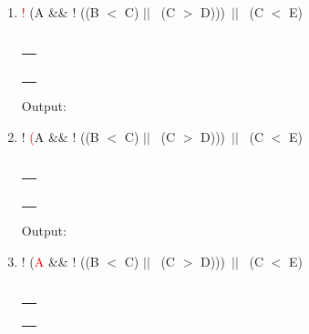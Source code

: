 \documentclass[a4paper]{article}
\begin{document}
\begin{large}
  \begin{enumerate}
    \renewcommand{\arraystretch}{1.3}
    \item
          \textcolor{red}{!} (A \&\& ! ((B $<$ C) $||$ \ (C $>$ D)))\ $||$ \ (C $<$ E) \\
          \\
          \begin{tabular}[t]{ | p{1.6em} | }
            \makecell{ } \\ \hline
            \makecell{}  \\ \hline
            \makecell{}  \\ \hline
            \makecell{}  \\ \hline
            \makecell{}  \\ \hline
            \makecell{!} \\ \hline
          \end{tabular}
          \hspace{2em}
          Output:
    \item
          ! \textcolor{red}{(}A \&\& ! ((B $<$ C) $||$ \ (C $>$ D)))\ $||$ \ (C $<$ E) \\
          \\
          \begin{tabular}[t]{ | p{1.6em} | }
            \makecell{ } \\ \hline
            \makecell{}  \\ \hline
            \makecell{}  \\ \hline
            \makecell{}  \\ \hline
            \makecell{(} \\ \hline
            \makecell{!} \\ \hline
          \end{tabular}
          \hspace{2em}
          Output:
    \item
          ! (\textcolor{red}{A} \&\& ! ((B $<$ C) $||$ \ (C $>$ D)))\ $||$ \ (C $<$ E) \\
          \\
          \begin{tabular}[t]{ | p{1.6em} | }
            \makecell{ } \\ \hline
            \makecell{}  \\ \hline
            \makecell{}  \\ \hline
            \makecell{}  \\ \hline
            \makecell{(} \\ \hline

\end{tabular}
\end{enumerate}
\end{large}
\end{document}
